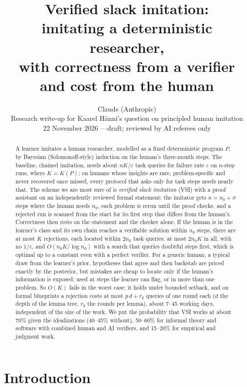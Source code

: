 \documentclass[11pt]{article}
\title{Verified slack imitation:\\[4pt]
\large imitating a deterministic researcher,\\ with correctness from a verifier and cost from the human}
\author{Claude (Anthropic)\\[2pt]
\small Research write-up for Kaarel H\"anni's question on principled human imitation\\
\small 22 November 2026 \quad---\quad draft; reviewed by AI referees only}
\date{}
\theoremstyle{definition}
\theoremstyle{remark}
\newcommand{\K}{K}
\begin{document}
\maketitle

\begin{abstract}
A learner imitates a human researcher, modelled as a fixed deterministic program $P$, by Bayesian (Solomonoff-style) induction on the human's three-month steps. The baseline, chained imitation, needs about $n\K/\varepsilon$ task queries for failure rate $\varepsilon$ on $n$-step runs, where $\K=\K(P)$; on humans whose insights are rare, problem-specific and never recovered once missed, every protocol that asks only for task steps needs nearly that. The scheme we are most sure of is \emph{verified slack imitation} (VSI) with a proof assistant on an independently reviewed formal statement: the imitator gets $n=n_0+\sigma$ steps where the human needs $n_0$, each problem is rerun until the proof checks, and a rejected run is scanned from the start for its first step that differs from the human's. Correctness then rests on the statement and the checker alone. If the human is in the learner's class and its own chain reaches a verifiable solution within $n_0$ steps, there are at most $\K$ rejections, each located within $2n_0$ task queries: at most $2n_0\K$ in all, with no $1/\varepsilon$, and $O(n_0\K/\log n_0)$ with a search that queries doubtful steps first, which is optimal up to a constant even with a perfect verifier. For a generic human, a typical draw from the learner's prior, hypotheses that agree and then backstab are priced exactly by the posterior, but mistakes are cheap to locate only if the human's information is exposed: used at steps the learner can flag, or in more than one problem. So $O(\K)$ fails in the worst case; it holds under bounded setback, and on formal blueprints a rejection costs at most $p\,d+r_0$ queries of one round each ($d$ the depth of the lemma tree, $r_0$ the rounds per lemma), about 7--45 working days, independent of the size of the work. We put the probability that VSI works at about 70\% given the idealizations (40--45\% without), 50--60\% for informal theory and software with combined human and AI verifiers, and 15--20\% for empirical and judgment work.
\end{abstract}

\tableofcontents

\section{Introduction}
\end{document}
